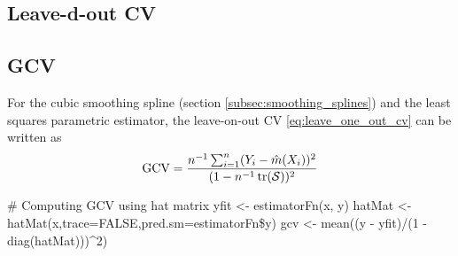\subsection{Leave-d-out CV}

\subsection{GCV}
\begin{theory}
 For the cubic smoothing spline (section \ref{subsec:smoothing_splines}) and the least squares parametric estimator,
 the leave-on-out CV \eqref{eq:leave_one_out_cv} can be written as
\begin{equation*}
 \text{GCV} = \frac{n^{-1}\sum_{i=1}^n(Y_i - \hat{m}(X_i))^2}{(1-n^{-1} \operatorname{tr}(\mathcal{S}))^2}
\end{equation*}
\end{theory}

\begin{code}
 # Computing GCV using hat matrix
 yfit <- estimatorFn(x, y)
 hatMat <- hatMat(x,trace=FALSE,pred.sm=estimatorFn\$y) %
 gcv <- mean((y - yfit)/(1 - diag(hatMat)))^2)
\end{code}
